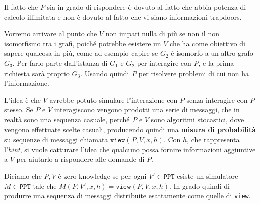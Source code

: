 Il fatto che $P$ sia in grado di rispondere è dovuto al fatto che abbia potenza di calcolo illimitata e non 
è dovuto al fatto che vi siano informazioni trapdoors. 

Vorremo arrivare al punto che $V$ non impari nulla di più se non il non isomorfismo tra i grafi, poiché 
potrebbe esistere un $V$ che ha come obiettivo di sapere qualcosa in più, come ad esempio capire se $G_2$
è isomorfo a un altro grafo $G_3$. Per farlo parte dall'istanza di $G_1$ e $G_2$ per interagire con $P$, 
e la prima richiesta sarà proprio $G_3$. Usando quindi $P$ per risolvere problemi di cui non ha 
l'informazione. 

L'idea è che $V$ avrebbe potuto simulare l'interazione con $P$ senza interagire con $P$ stesso.
Se $P$ e $V$ interagiscono vengono prodotti una serie di messaggi, che in realtà sono una sequenza casuale,
perché $P$ e $V$ sono algoritmi stocastici, dove vengono effettuate scelte casuali, producendo quindi
una \textbf{misura di probabilità} su sequenze di messaggi chiamata $\texttt{view}(P,V,x,h)$. 
Con $h$, che rappresenta l'\textit{hint}, si vuole catturare l'idea che qualcuno possa fornire informazioni 
aggiuntive a $V$ per aiutarlo a rispondere alle domande di $P$.

\begin{tcolorbox}
    Diciamo che $P,V$ è zero-knowledge se per ogni $V'\in \texttt{PPT}$ esiste un simulatore $M \in \texttt{PPT}$
    tale che $M(P,V',x,h) = \texttt{view}(P,V,x,h)$. In grado quindi di produrre una sequenza di messaggi
    distribuite esattamente come quelle di \texttt{view}.   
\end{tcolorbox} 